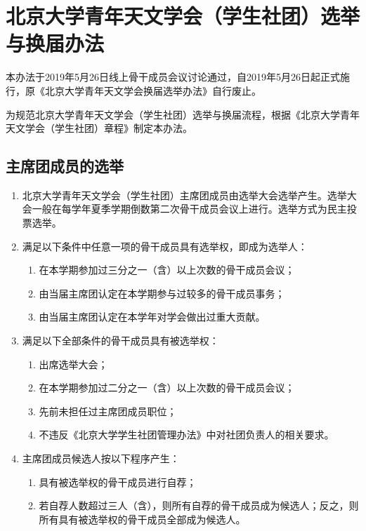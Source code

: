 \chapter{北京大学青年天文学会（学生社团）选举与换届办法}

本办法于2019年5月26日线上骨干成员会议讨论通过，自2019年5月26日起正式施行，原《北京大学青年天文学会换届选举办法》自行废止。

为规范北京大学青年天文学会（学生社团）选举与换届流程，根据《北京大学青年天文学会（学生社团）章程》制定本办法。

\section{主席团成员的选举}

\begin{enumerate}
    \item 北京大学青年天文学会（学生社团）主席团成员由选举大会选举产生。选举大会一般在每学年夏季学期倒数第二次骨干成员会议上进行。选举方式为民主投票选举。
    
    \item 满足以下条件中任意一项的骨干成员具有选举权，即成为选举人：
    
    \begin{enumerate}
        \item 在本学期参加过三分之一（含）以上次数的骨干成员会议；
        \item 由当届主席团认定在本学期参与过较多的骨干成员事务；
        \item 由当届主席团认定在本学年对学会做出过重大贡献。
    \end{enumerate}
    
    \item 满足以下全部条件的骨干成员具有被选举权：
    
    \begin{enumerate}
        \item 出席选举大会；
        \item 在本学期参加过二分之一（含）以上次数的骨干成员会议；
        \item 先前未担任过主席团成员职位；
        \item 不违反《北京大学学生社团管理办法》中对社团负责人的相关要求。
    \end{enumerate}
    
    \item 主席团成员候选人按以下程序产生：
    
    \begin{enumerate}
        \item 具有被选举权的骨干成员进行自荐；
        \item 若自荐人数超过三人（含），则所有自荐的骨干成员成为候选人；反之，则所有具有被选举权的骨干成员全部成为候选人。
    \end{enumerate}
    

\end{enumerate}
